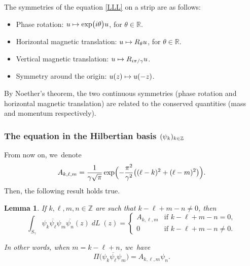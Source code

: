 \documentclass[10pt]{amsart}
\newcommand\mto{\mathchoice{\longmapsto}{\mapsto}{\mapsto}{\mapsto}}
\DeclareMathOperator{\dL}{\mathit{dL}}
\newtheorem{lemme}[theorem]{Lemma}
\theoremstyle{definition}
\let\EE\exp
\let\dis\relax
\let\ov\overline
\newcommand\Z{\mathbb Z}
\begin{document}
The symmetries of the equation \eqref{LLL} on a strip are as follows:
\begin{itemize}
\item Phase rotation: $u \mto \EE\bigl({i \theta}\bigr) u$, for $\theta\in \mathbb{R}$.
\item Horizontal magnetic translation: $u \mto R_\theta u$, for $\theta\in \mathbb{R}$.
\item Vertical magnetic translation: $\dis u \mto R_{{i\pi}/{\gamma}} u$.
\item Symmetry around the origin: $u(z) \mto u(-z)$.
\end{itemize}

By Noether's theorem, the two continuous symmetries (phase rotation and horizontal magnetic translation) are related to the conserved quantities (mass and momentum respectively).

\subsubsection{The equation in the Hilbertian basis $\dis (\psi_k)_{k \in \Z}$}

From now on, we~denote
\begin{equation}\label{def-A}
A_{k,\ell,m} = \frac{1}{\gamma\sqrt{\pi}}\EE\Bigl(-\frac{\pi^2}{\gamma^2}\bigl((\ell-k)^2+(\ell-m)^2\bigr)\Bigr).
\end{equation}
Then, the following result holds true.

\begin{lemme}\label{lem-ortho}
If $k,\ell,m,n \in \mathbb{Z}$ are such that $k - \ell + m - n \neq 0$, then
\begin{equation*}
\int_{S_{\gamma}} \psi_{k}\ov{\psi_{\ell}} \psi_{m}\ov{\psi_{n}}(z)\dL(z)
=\begin{cases}
\displaystyle A_{k,\ell,m} & \text{if $k - \ell + m - n = 0$}, \\
0 & \text{if $k - \ell + m - n \neq 0$}.
\end{cases}
\end{equation*}

In other words, when $m = k - \ell + n$, we~have
\begin{equation}\label{proj3}
\Pi\bigl(\psi_{k}\ov{\psi_{\ell}} \psi_{m}\bigr)
=A_{k,\ell,m} \psi_{n}.
\end{equation}
\end{lemme}
\end{document}
